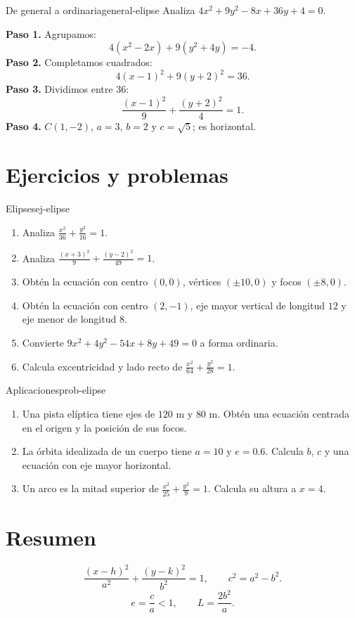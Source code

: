 \begin{example}{De general a ordinaria}{general-elipse}
Analiza $4x^2+9y^2-8x+36y+4=0$.
\begin{solution}
\textbf{Paso 1.} Agrupamos:
\[
4(x^2-2x)+9(y^2+4y)=-4.
\]
\textbf{Paso 2.} Completamos cuadrados:
\[
4(x-1)^2+9(y+2)^2=36.
\]
\textbf{Paso 3.} Dividimos entre $36$:
\[
\frac{(x-1)^2}{9}+\frac{(y+2)^2}{4}=1.
\]
\textbf{Paso 4.} $C(1,-2)$, $a=3$, $b=2$ y $c=\sqrt5$; es horizontal.
\end{solution}
\end{example}

\section{Ejercicios y problemas}

\begin{exercise}{Elipses}{ej-elipse}
\begin{enumerate}
  \item Analiza $\frac{x^2}{36}+\frac{y^2}{16}=1$.
  \item Analiza $\frac{(x+3)^2}{9}+\frac{(y-2)^2}{49}=1$.
  \item Obtén la ecuación con centro $(0,0)$, vértices $(\pm10,0)$ y focos
  $(\pm8,0)$.
  \item Obtén la ecuación con centro $(2,-1)$, eje mayor vertical de longitud
  $12$ y eje menor de longitud $8$.
  \item Convierte $9x^2+4y^2-54x+8y+49=0$ a forma ordinaria.
  \item Calcula excentricidad y lado recto de $\frac{x^2}{64}+\frac{y^2}{28}=1$.
\end{enumerate}
\end{exercise}

\begin{problem}{Aplicaciones}{prob-elipse}
\begin{enumerate}
  \item Una pista elíptica tiene ejes de $120$ m y $80$ m. Obtén una ecuación
  centrada en el origen y la posición de sus focos.
  \item La órbita idealizada de un cuerpo tiene $a=10$ y $e=0.6$. Calcula
  $b$, $c$ y una ecuación con eje mayor horizontal.
  \item Un arco es la mitad superior de $\frac{x^2}{25}+\frac{y^2}{9}=1$.
  Calcula su altura a $x=4$.
\end{enumerate}
\end{problem}

\section*{Resumen}
\begin{properties}
\[
\frac{(x-h)^2}{a^2}+\frac{(y-k)^2}{b^2}=1,
\qquad c^2=a^2-b^2.
\]
\[
e=\frac ca<1,
\qquad L=\frac{2b^2}{a}.
\]
\end{properties}
